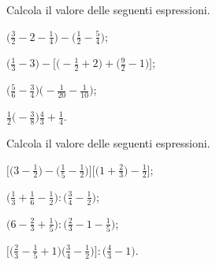 \begin{esercizio}[\Ast]%
 \label{ese:3.138}
 Calcola il valore delle seguenti espressioni.
\begin{multicols}{2}
\begin{enumeratea}
\spazielenx
\item $\displaystyle{\bigg(\frac{3}{2}-2-\frac{1}{4}\bigg)-\bigg(\frac{1}{2}-\frac{5}{4}\bigg)}$;
\item $\displaystyle{\bigg(\frac{1}{3}-3\bigg)-\bigg[\bigg(-\frac{1}{2}+2\bigg)+\bigg(\frac{9}{2}-1\bigg)\bigg]}$;
\item $\displaystyle{\bigg(\frac{5}{6}-\frac{3}{4}\bigg)\bigg(-\frac{1}{20}-\frac{1}{10}\bigg)}$;
\item $\displaystyle{\frac{1}{2}\bigg(-\frac{3}{8}\bigg)\frac{4}{3}+\frac{1}{4}}$.
\end{enumeratea}
\end{multicols}
\end{esercizio}
\pagebreak
\begin{esercizio}[\Ast]%
 \label{ese:3.139}
 Calcola il valore delle seguenti espressioni.
\begin{multicols}{2}
\begin{enumeratea}
\spazielenx
\item $\displaystyle{\bigg[\bigg(3-\frac{1}{2}\bigg)-\bigg(\frac{1}{5}-\frac{1}{2}\bigg)\bigg]\bigg[\bigg(1+\frac{2}{3}\bigg)-\frac{1}{2}\bigg]}$;
\item $\displaystyle{\bigg(\frac{1}{3}+\frac{1}{6}-\frac{1}{2}\bigg):\bigg(\frac{3}{4}-\frac{1}{2}\bigg)}$;
\item $\displaystyle{\bigg(6-\frac{2}{3}+\frac{1}{5}\bigg):\bigg(\frac{2}{3}-1-\frac{1}{5}\bigg)}$;
\item $\displaystyle{\bigg[\bigg(\frac{2}{3}-\frac{1}{5}+1\bigg)\bigg(\frac{3}{4}-\frac{1}{2}\bigg)\bigg]:\bigg(\frac{4}{3}-1\bigg)}$.
\end{enumeratea}
\end{multicols}
\end{esercizio}

